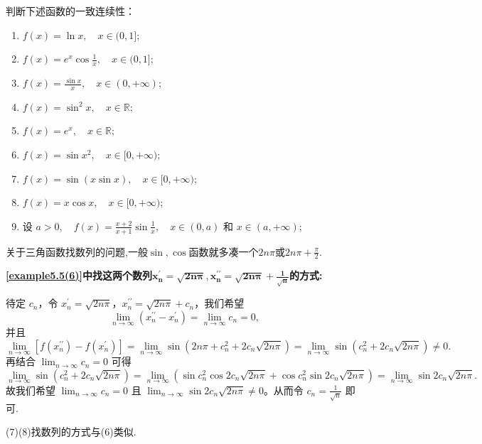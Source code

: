 \documentclass[../../main.tex]{subfiles}%
\begin{document}
\begin{example}
判断下述函数的一致连续性：
\begin{enumerate}[(1)]
\item \( f(x) = \ln x, \quad x \in (0, 1]; \)

\item \( f(x) = e^x \cos \frac{1}{x}, \quad x \in (0, 1]; \)

\item \( f(x) = \frac{\sin x}{x}, \quad x \in (0, +\infty); \)

\item \( f(x) = \sin^2 x, \quad x \in \mathbb{R}; \)

\item \( f(x) = e^x, \quad x \in \mathbb{R}; \)

\item \( f(x) = \sin x^2, \quad x \in [0, +\infty); \)

\item \( f(x) = \sin (x \sin x), \quad x \in [0, +\infty); \)

\item \( f(x) = x \cos x, \quad x \in [0, +\infty); \)

\item 设 \( a > 0, \quad f(x) = \frac{x+2}{x+1} \sin \frac{1}{x}, \quad x \in (0, a) \) 和 \( x \in (a, +\infty); \)
\end{enumerate}
\end{example}
\begin{note}
关于三角函数找数列的问题,一般$\sin,\cos$函数就多凑一个$2n\pi$或$2n\pi+\frac{\pi}{2}$.
\end{note}
\begin{remark}
\hypertarget{找这两个数列的方法}{\textbf{\ref{example5.5(6)}中找这两个数列$\boldsymbol{x}_{\boldsymbol{n}}^{\prime}=\sqrt{\mathbf{2}\boldsymbol{n\pi }},\boldsymbol{x}_{\boldsymbol{n}}^{\prime\prime}=\sqrt{\mathbf{2}\boldsymbol{n\pi }}+\frac{\mathbf{1}}{\sqrt{\boldsymbol{n}}}$的方式:}}待定 $c_n$，令 $x_{n}^{\prime} = \sqrt{2n\pi}$，$x_{n}^{\prime\prime} = \sqrt{2n\pi} + c_n$，我们希望
\[
\lim_{n \rightarrow \infty} \left( x_{n}^{\prime\prime} - x_{n}^{\prime} \right) = \lim_{n \rightarrow \infty} c_n = 0,
\]
并且
\[
\lim_{n \rightarrow \infty} \left[ f\left( x_{n}^{\prime\prime} \right) - f\left( x_{n}^{\prime} \right) \right] = \lim_{n \rightarrow \infty} \sin \left( 2n\pi + c_{n}^{2} + 2c_n \sqrt{2n\pi} \right) = \lim_{n \rightarrow \infty} \sin \left( c_{n}^{2} + 2c_n \sqrt{2n\pi} \right) \ne 0.
\]
再结合 $\lim_{n \rightarrow \infty} c_n = 0$ 可得
\[
\lim_{n \rightarrow \infty} \sin \left( c_{n}^{2} + 2c_n \sqrt{2n\pi} \right) = \lim_{n \rightarrow \infty} \left( \sin c_{n}^{2} \cos 2c_n \sqrt{2n\pi} + \cos c_{n}^{2} \sin 2c_n \sqrt{2n\pi} \right) = \lim_{n \rightarrow \infty} \sin 2c_n \sqrt{2n\pi}.
\]
故我们希望 $\lim_{n \rightarrow \infty} c_n = 0$ 且 $\lim_{n \rightarrow \infty} \sin 2c_n \sqrt{2n\pi} \ne 0$。从而令 $c_n = \frac{1}{\sqrt{n}}$ 即可.

(7)(8)找数列的方式与(6)类似.
\end{remark}
\end{document}
